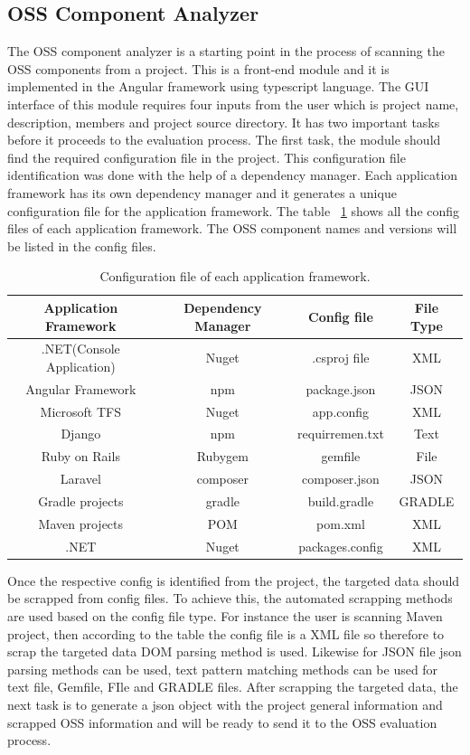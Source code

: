 \subsection{OSS Component Analyzer}
The \acs{OSS} component analyzer is a starting point in the process of scanning the \acs{OSS} components from a project. This is a front-end module and it is implemented in the Angular framework using typescript language. The GUI interface of this module requires four inputs from the user which is project name, description, members and project source directory. It has two important tasks before it proceeds to the evaluation process. The first task, the module should find the required configuration file in the project. This configuration file identification was done with the help of a dependency manager. Each application framework has its own dependency manager and it generates a unique configuration file for the application framework. The table ~\ref{tab:configFiles} shows all the config files of each application framework. The \acs{OSS} component names and versions will be listed in the config files. 
\begin{table}[h!]
\begin{center}
 \begin{tabular}{ |c|c|c|c| } 
 	\hline
 	Application Framework & Dependency Manager & Config file & File Type \\
 	\hline
 	.NET(Console Application) & Nuget & .csproj file & XML \\ 
 	Angular Framework & npm & package.json & JSON \\ 
 	Microsoft TFS & Nuget & app.config & XML \\ 
 	Django & npm & requirremen.txt & Text\\ 
 	Ruby on Rails & Rubygem & gemfile & File \\ 
 	Laravel & composer & composer.json & JSON \\ 
 	Gradle projects & gradle & build.gradle & GRADLE \\ 
 	Maven projects & POM & pom.xml & XML \\ 
 	.NET & Nuget & packages.config & XML \\ 
 	\hline
 \end{tabular}
\caption{Configuration file of each application framework.}\label{tab:configFiles}
\end{center} 
\end{table}

Once the respective config is identified from the project, the targeted data should be scrapped from config files. To achieve this, the automated scrapping methods are used based on the config file type. For instance the user is scanning Maven project, then according to the table the config file is a XML file so therefore to scrap the targeted data \acs{DOM} parsing method is used. Likewise for \acs{JSON} file json parsing methods can be used, text pattern matching methods can be used for text file, Gemfile, FIle and GRADLE files. After scrapping the targeted data, the next task is to generate a json object with the project general information and scrapped \ac{OSS} information and will be ready to send it to the \acs{OSS} evaluation process. 

